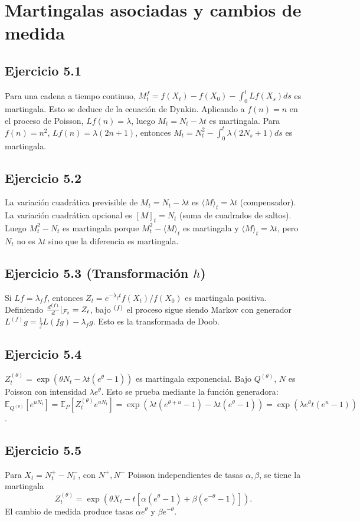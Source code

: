 \documentclass[12pt]{article}
\let\P\relax
\newcommand{\P}{\mathbb{P}}
\newcommand{\E}{\mathbb{E}}
\newcommand{\1}{\mathbf{1}}
\newcommand{\F}{\mathcal{F}}
\begin{document}
\section{Martingalas asociadas y cambios de medida}

\subsection{Ejercicio 5.1}
Para una cadena a tiempo continuo, $M_t^f=f(X_t)-f(X_0)-\int_0^t Lf(X_s)ds$ es martingala. Esto se deduce de la ecuaci\'on de Dynkin. Aplicando a $f(n)=n$ en el proceso de Poisson, $Lf(n)=\lambda$, luego $M_t=N_t-\lambda t$ es martingala. Para $f(n)=n^2$, $Lf(n)=\lambda(2n+1)$, entonces $M_t=N_t^2-\int_0^t\lambda(2N_s+1)ds$ es martingala.

\subsection{Ejercicio 5.2}
La variaci\'on cuadr\'atica previsible de $M_t=N_t-\lambda t$ es $\langle M\rangle_t=\lambda t$ (compensador). La variaci\'on cuadr\'atica opcional es $[M]_t=N_t$ (suma de cuadrados de saltos). Luego $M_t^2-N_t$ es martingala porque $M_t^2-\langle M\rangle_t$ es martingala y $\langle M\rangle_t=\lambda t$, pero $N_t$ no es $\lambda t$ sino que la diferencia es martingala.

\subsection{Ejercicio 5.3 (Transformaci\'on $h$)}
Si $Lf=\lambda_f f$, entonces $Z_t=e^{-\lambda_f t}f(X_t)/f(X_0)$ es martingala positiva. Definiendo $\frac{d\P^{(f)}}{d\P}|_{\F_t}=Z_t$, bajo $\P^{(f)}$ el proceso sigue siendo Markov con generador $L^{(f)}g = \frac1f L(fg)-\lambda_f g$. Esto es la transformada de Doob.

\subsection{Ejercicio 5.4}
$Z_t^{(\theta)}=\exp(\theta N_t-\lambda t(e^\theta-1))$ es martingala exponencial. Bajo $Q^{(\theta)}$, $N$ es Poisson con intensidad $\lambda e^\theta$. Esto se prueba mediante la funci\'on generadora: $\E_{Q^{(\theta)}}[e^{u N_t}]=\E_P[Z_t^{(\theta)}e^{u N_t}]=\exp(\lambda t(e^{\theta+u}-1)-\lambda t(e^\theta-1))=\exp(\lambda e^\theta t(e^u-1))$.

\subsection{Ejercicio 5.5}
Para $X_t=N^+_t-N^-_t$, con $N^+,N^-$ Poisson independientes de tasas $\alpha,\beta$, se tiene la martingala
\[
Z_t^{(\theta)}=\exp(\theta X_t-t[\alpha(e^\theta-1)+\beta(e^{-\theta}-1)]).
\]
El cambio de medida produce tasas $\alpha e^\theta$ y $\beta e^{-\theta}$.
\end{document}
